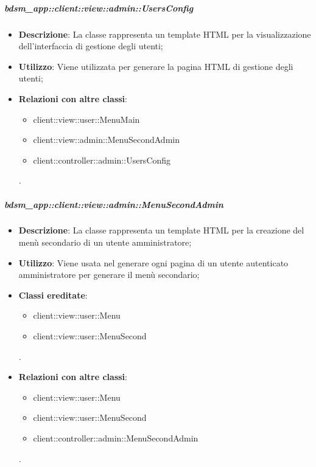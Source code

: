 		\subparagraph{bdsm\_app::client::view::admin::UsersConfig} %
		\label{subp:bdsm_app_client_view_admin_usersconfig}
			\begin{itemize}
				\item \textbf{Descrizione}: La classe rappresenta un template HTML per la visualizzazione dell'interfaccia di gestione degli utenti;
				\item \textbf{Utilizzo}: Viene utilizzata per generare la pagina HTML di gestione degli utenti;
				\item \textbf{Relazioni con altre classi}: 		
					\begin{itemize}
						\item client::view::user::MenuMain
						\item client::view::admin::MenuSecondAdmin
						\item client::controller::admin::UsersConfig
					\end{itemize}.
			\end{itemize}

		\subparagraph{bdsm\_app::client::view::admin::MenuSecondAdmin} %
		\label{subp:bdsm_app_client_view_admin_menusecondadmin}
			\begin{itemize}
				\item \textbf{Descrizione}: La classe rappresenta un template HTML per la creazione del menù secondario di un utente amministratore;
				\item \textbf{Utilizzo}: Viene usata nel generare ogni pagina di un utente autenticato amministratore per generare il menù secondario;
				\item \textbf{Classi ereditate}: 				
					\begin{itemize}
						\item client::view::user::Menu		
						\item client::view::user::MenuSecond					
					\end{itemize}.
				\item \textbf{Relazioni con altre classi}: 		
					\begin{itemize}
						\item client::view::user::Menu
						\item client::view::user::MenuSecond
						\item client::controller::admin::MenuSecondAdmin	
					\end{itemize}.
			\end{itemize}

